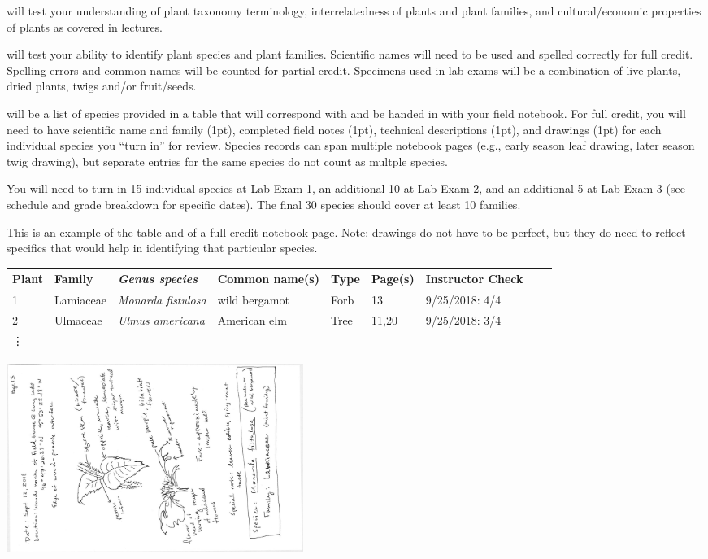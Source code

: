 \documentclass{tufte-handout}
\begin{document}
\begin{fullwidth}

 will test your understanding of plant taxonomy terminology, interrelatedness of plants and plant families, and cultural/economic properties of plants as covered in lectures. 

 will test your ability to identify plant species and plant families. Scientific names will need to be used and spelled correctly for full credit. Spelling errors and common names will be counted for partial credit. Specimens used in lab exams will be a combination of live plants, dried plants, twigs and/or fruit/seeds.

 will be a list of species provided in a table that will correspond with and be handed in with your field notebook.  For full credit, you will need to have scientific name and family (1pt), completed field notes (1pt), technical descriptions (1pt), and drawings (1pt) for each individual species you ``turn in'' for review. Species records can span multiple notebook pages (e.g., early season leaf drawing, later season twig drawing), but separate entries for the same species do not count as multple species. 

You will need to turn in 15 individual species at Lab Exam 1, an additional 10 at Lab Exam 2, and an additional 5 at Lab Exam 3 (see schedule and grade breakdown for specific dates). The final 30 species should cover at least 10 families.

This is an example of the table and of a full-credit notebook page. Note: drawings do not have to be perfect, but they do need to reflect specifics that would help in identifying that particular species. 

\begin{tabular}{lllllllll}
\hline
Plant & Family & \emph{Genus species} & Common name(s) & Type & Page(s) & Instructor Check & \\
\hline
1 & Lamiaceae & \emph{Monarda fistulosa} & wild bergamot & Forb & 13 & 9/25/2018: 4/4 \\
2 & Ulmaceae & \emph{Ulmus americana} & American elm & Tree & 11,20 & 9/25/2018: 3/4 \\
\vdots \\
\hline
\end{tabular}

\includegraphics[width=3.8in,angle=90]{example_notebook.jpg}


\end{fullwidth}
\end{document}

